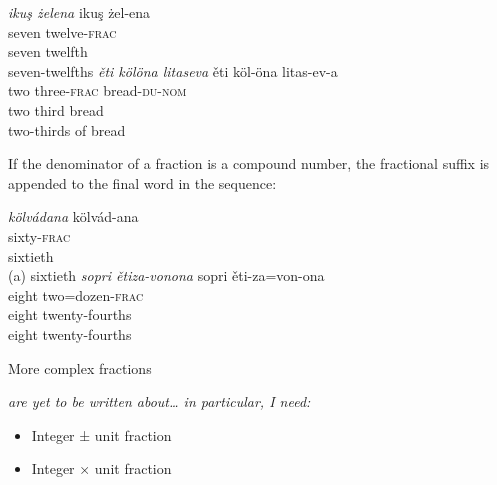 \documentclass[grammar]{subfiles}
\begin{document}
  \begin{exe}
    \ex
    \begin{xlist}
      \ex \textit{ikuş żelena}
      \glll ikuş żel-ena\\
      seven twelve\textsc{-frac}\\
      seven twelfth\\
      \glt seven-twelfths
      \ex \textit{ěti kölöna litaseva}
      \glll ěti köl-öna litas-ev-a\\
      two three\textsc{-frac} bread\textsc{-du-nom}\\
      two third bread\\
      \glt two-thirds of bread
    \end{xlist}
  \end{exe}

  If the denominator of a fraction is a compound number, the fractional suffix is appended to the final word in the sequence:

  \begin{exe}
    \ex
    \begin{xlist}
      \ex \textit{kölvádana}
      \glll kölvád-ana\\
      sixty\textsc{-frac}\\
      sixtieth\\
      \glt (a) sixtieth
      \ex \textit{sopri ětiza-vonona}
      \glll sopri ěti-za=von-ona\\
      eight two=dozen\textsc{-frac}\\
      eight twenty-fourths\\
      \glt eight twenty-fourths
    \end{xlist}
  \end{exe}


  More complex fractions {\em are yet to be written about… in particular, I need:
    \begin{itemize}
      \item Integer ± unit fraction
      \item Integer × unit fraction
    \end{itemize}
  }
\end{document}

